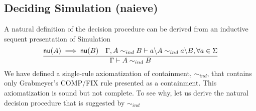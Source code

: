 \subsection{Deciding Simulation (naieve)}
A natural definition of the decision procedure can be derived from an inductive sequent presentation of Simulation 
\[\infer{\Gamma \vdash A \simind B}{\mynu{A} \implies \mynu{B} &  \Gamma, A \simind B \vdash \derive{a}{A} \simind \derive{a}{B},\forall a \in \Sigma }\]
We have defined a single-rule axiomatization of containment, $\sim_{ind}$, that contains only Grabmeyer's \textsf{COMP/FIX} rule presented as a containment. This axiomatization is sound but not complete. To see why, let us derive the natural decision procedure that is suggested by $\sim_{ind}$


